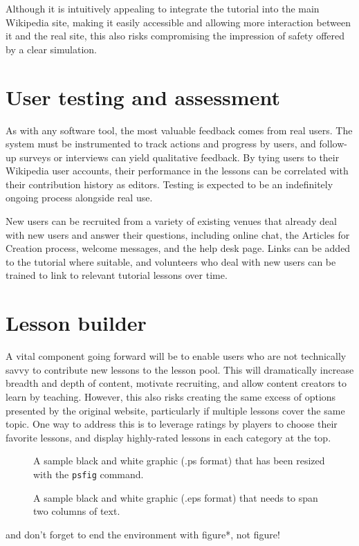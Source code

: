 \documentclass{acm_proc_article-sp}
\begin{document}
Although it is intuitively appealing to integrate the tutorial into the main Wikipedia site, making it easily accessible and allowing more interaction between it and the real site, this also risks compromising the impression of safety offered by a clear simulation.

\section{User testing and assessment}
As with any software tool, the most valuable feedback comes from real users. The system must be instrumented to track actions and progress by users, and follow-up surveys or interviews can yield qualitative feedback. By tying users to their Wikipedia user accounts, their performance in the lessons can be correlated with their contribution history as editors. Testing is expected to be an indefinitely ongoing process alongside real use.

New users can be recruited from a variety of existing venues that already deal with new users and answer their questions, including online chat, the Articles for Creation process, welcome messages, and the help desk page. Links can be added to the tutorial where suitable, and volunteers who deal with new users can be trained to link to relevant tutorial lessons over time.

\section{Lesson builder}

A vital component going forward will be to enable users who are not technically savvy to contribute new lessons to the lesson pool. This will dramatically increase breadth and depth of content, motivate recruiting, and allow content creators to learn by teaching. However, this also risks creating the same excess of options presented by the original website, particularly if multiple lessons cover the same topic. One way to address this is to leverage ratings by players to choose their favorite lessons, and display highly-rated lessons in each category at the top.

\begin{figure}
\centering
\caption{A sample black and white graphic (.ps format) that has
been resized with the \texttt{psfig} command.}
\end{figure}

\begin{figure*}
\centering
\caption{A sample black and white graphic (.eps format)
that needs to span two columns of text.}
\end{figure*}
and don't forget to end the environment with
{figure*}, not {figure}!
 
\end{document}
